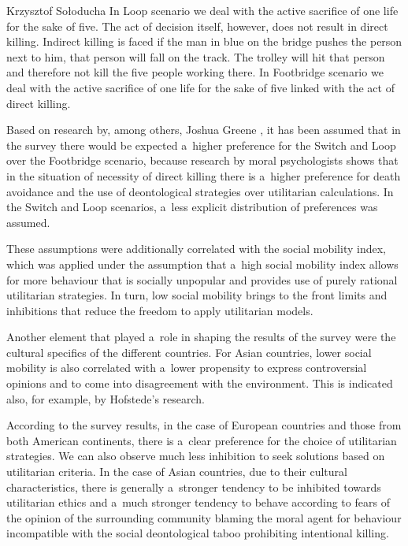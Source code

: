 \begin{artengenv}{Krzysztof Sołoducha}
In Loop scenario we deal with the active sacrifice of one life for the sake of five. The act of decision itself, however, does not result in direct killing. Indirect killing is faced if the man in blue on the bridge pushes the person next to him, that person will fall on the track. The trolley will hit that person and therefore not kill the five people working there. In Footbridge scenario we deal with the active sacrifice of one life for the sake of five linked with the act of direct killing.

Based on research by, among others, Joshua Greene
\parencite*[][]{greene_moral_2013}, %
 it has been assumed that in the survey there would be expected a~higher preference for the Switch and Loop over the Footbridge scenario, because research by moral psychologists shows that in the situation of necessity of direct killing there is a~higher preference for death avoidance and the use of deontological strategies over utilitarian calculations. In the Switch and Loop scenarios, a~less explicit distribution of preferences was assumed.

These assumptions were additionally correlated with the social mobility index, which was applied under the assumption that a~high social mobility index allows for more behaviour that is socially unpopular and provides use of purely rational utilitarian strategies. In turn, low social mobility brings to the front limits and inhibitions that reduce the freedom to apply utilitarian models.

Another element that played a~role in shaping the results of the survey were the cultural specifics of the different countries. For Asian countries, lower social mobility is also correlated with a~lower propensity to express controversial opinions and to come into disagreement with the environment. This is indicated also, for example, by Hofstede's research.

According to the survey results, in the case of European countries and those from both American continents, there is a~clear preference for the choice of utilitarian strategies. We can also observe much less inhibition to seek solutions based on utilitarian criteria. In the case of Asian countries, due to their cultural characteristics, there is generally a~stronger tendency to be inhibited towards utilitarian ethics and a~much stronger tendency to behave according to fears of the opinion of the surrounding community blaming the moral agent for behaviour incompatible with the social deontological taboo prohibiting intentional killing.


\end{artengenv}
